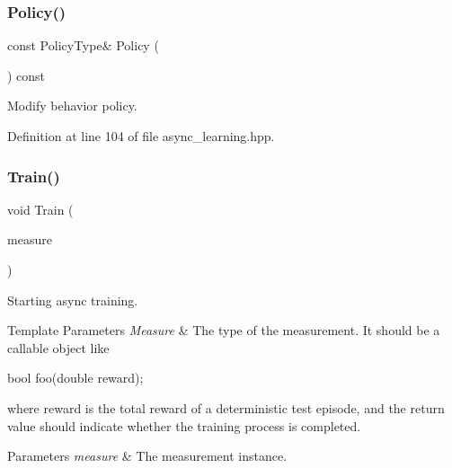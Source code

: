 \subsubsection{Policy()\hspace{0.1cm}{\footnotesize\ttfamily [2/2]}}
{\footnotesize\ttfamily const Policy\+Type\& Policy (\begin{DoxyParamCaption}{ }\end{DoxyParamCaption}) const\hspace{0.3cm}{\ttfamily [inline]}}



Modify behavior policy. 



Definition at line 104 of file async\+\_\+learning.\+hpp.

\mbox{\label{classmlpack_1_1rl_1_1AsyncLearning_ae1533b4fc586f67a0c38757ed08a27c7}} 
\subsubsection{Train()}
{\footnotesize\ttfamily void Train (\begin{DoxyParamCaption}\item[{Measure \&}]{measure }\end{DoxyParamCaption})}



Starting async training. 


\begin{DoxyTemplParams}{Template Parameters}
{\em Measure} & The type of the measurement. It should be a callable object like 
\begin{DoxyCode}
\textcolor{keywordtype}{bool} foo(\textcolor{keywordtype}{double} reward);
\end{DoxyCode}
 where reward is the total reward of a deterministic test episode, and the return value should indicate whether the training process is completed. \\
\hline
\end{DoxyTemplParams}

\begin{DoxyParams}{Parameters}
{\em measure} & The measurement instance. \\
\hline
\end{DoxyParams}
\mbox{\label{classmlpack_1_1rl_1_1AsyncLearning_abbd240500a77c5f76a69eb874862d4ec}} 
